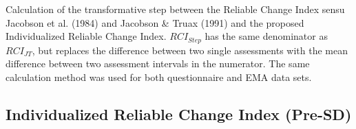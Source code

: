 \documentclass[12pt,twoside]{reedthesis}
\newenvironment{Shaded}{\begin{snugshade}}{\end{snugshade}}
\newcommand{\CommentTok}[1]{\textcolor[rgb]{0.56,0.35,0.01}{\textit{#1}}}
\newcommand{\DataTypeTok}[1]{\textcolor[rgb]{0.13,0.29,0.53}{#1}}
\newcommand{\DecValTok}[1]{\textcolor[rgb]{0.00,0.00,0.81}{#1}}
\newcommand{\FloatTok}[1]{\textcolor[rgb]{0.00,0.00,0.81}{#1}}
\newcommand{\KeywordTok}[1]{\textcolor[rgb]{0.13,0.29,0.53}{\textbf{#1}}}
\newcommand{\NormalTok}[1]{#1}
\newcommand{\OperatorTok}[1]{\textcolor[rgb]{0.81,0.36,0.00}{\textbf{#1}}}
\newcommand{\OtherTok}[1]{\textcolor[rgb]{0.56,0.35,0.01}{#1}}
\newcommand{\StringTok}[1]{\textcolor[rgb]{0.31,0.60,0.02}{#1}}
\begin{document}
Calculation of the transformative step between the Reliable Change Index sensu Jacobson et al. (1984) and Jacobson \& Truax (1991) and the proposed Individualized Reliable Change Index. \(RCI_{Step}\) has the same denominator as \(RCI_{JT}\), but replaces the difference between two single assessments with the mean difference between two assessment intervals in the numerator. The same calculation method was used for both questionnaire and EMA data sets.
\begin{Shaded}
\end{Shaded}
\hypertarget{r-rci-ind-pre}{%
\subsection{Individualized Reliable Change Index (Pre-SD)}\label{r-rci-ind-pre}}
\end{document}

